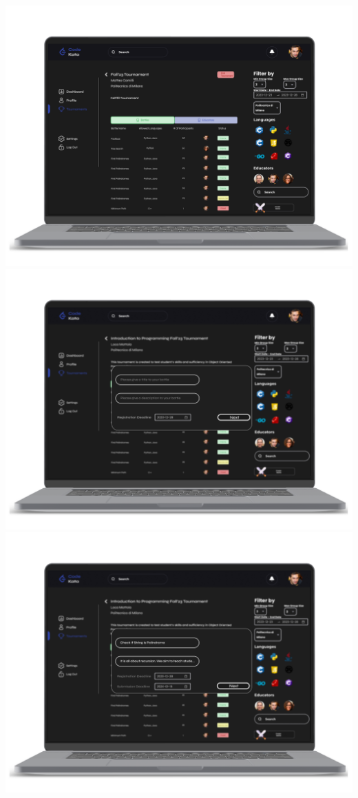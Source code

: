 \begin{center}
\includegraphics[scale=0.13]{Images/ui-ux/educator_creates_battle/educator_creates_battle_1.png}
\includegraphics[scale=0.13]{Images/ui-ux/educator_creates_battle/educator_creates_battle_2.png}
\includegraphics[scale=0.13]{Images/ui-ux/educator_creates_battle/educator_creates_battle_3.png}

\end{center}
